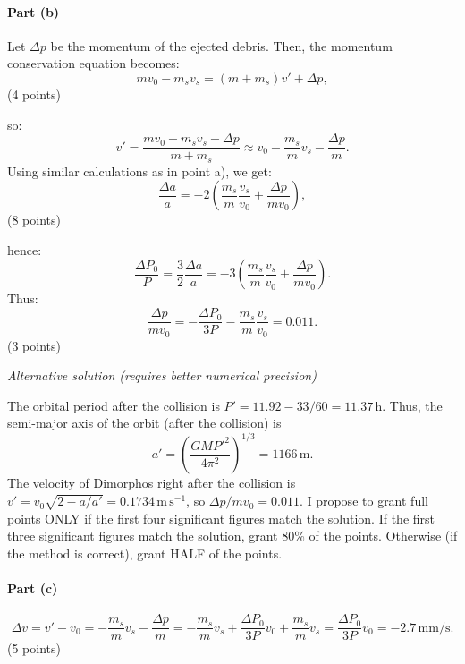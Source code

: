 \paragraph{Part (b)}

Let $\Delta p$ be the momentum of the ejected debris. Then, the momentum
conservation equation becomes:
\[
  mv_0 - m_s v_s = (m + m_s)v' + \Delta p,
\]
\hfill(4 points)

so:
\[
  v' = \frac{mv_0 - m_s v_s - \Delta p}{m + m_s}
    \approx v_0 - \frac{m_s}{m}v_s - \frac{\Delta p}{m}.
\]
Using similar calculations as in point a), we get:
\[
  \frac{\Delta a}{a}
    = -2\left(\frac{m_s}{m}\frac{v_s}{v_0} + \frac{\Delta p}{mv_0}\right),
\]
\hfill(8 points)

hence:
\[
  \frac{\Delta P_0}{P} = \frac{3}{2}\frac{\Delta a}{a}
    = -3\left(\frac{m_s}{m}\frac{v_s}{v_0} + \frac{\Delta p}{mv_0}\right).
\]
Thus:
\[
  \frac{\Delta p}{mv_0} = -\frac{\Delta P_0}{3P}
    - \frac{m_s}{m}\frac{v_s}{v_0} = 0.011.
\]
\hfill(3 points)

\medskip
\textit{Alternative solution (requires better numerical precision)}

The orbital period after the collision is
$P' = 11.92 - 33/60 = 11.37$\,h. Thus, the semi-major axis of the orbit (after
the collision) is
\[
  a' = \left(\frac{GMP'^2}{4\pi^2}\right)^{1/3} = 1166\,\mathrm{m}.
\]
The velocity of Dimorphos right after the collision is
$v' = v_0\sqrt{2 - a/a'} = 0.1734\,\mathrm{m\,s^{-1}}$, so
$\Delta p/mv_0 = 0.011$. I propose to grant full points ONLY if the first four
significant figures match the solution. If the first three significant figures
match the solution, grant 80\% of the points. Otherwise (if the method is
correct), grant HALF of the points.

\paragraph{Part (c)}
\[
  \Delta v = v' - v_0
    = -\frac{m_s}{m}v_s - \frac{\Delta p}{m}
    = -\frac{m_s}{m}v_s + \frac{\Delta P_0}{3P}v_0 + \frac{m_s}{m}v_s
    = \frac{\Delta P_0}{3P}v_0 = -2.7\,\mathrm{mm/s}.
\]
\hfill(5 points)

